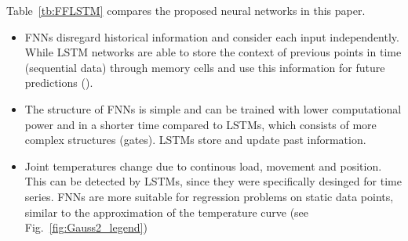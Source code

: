 \documentclass{ifacconf}
\begin{document}
Table~\ref{tb:FFLSTM} compares the proposed neural networks in this paper.
\begin{table}[ht]
  \begin{center}
  \caption{Comparison of Feedforward and LSTM neural networks}\label{tb:FFLSTM}
  \end{center}
\end{table}
\begin{itemize}
	\item FNNs disregard historical information and consider each input independently. While LSTM networks are able to store the context of previous points in time (sequential data) through memory cells and use this information for future predictions (\cite{Liu}).
  \item The structure of FNNs is simple and can be trained with lower computational power and in a shorter time compared to LSTMs, which consists of more complex structures (gates). LSTMs store and update past information.
  \item Joint temperatures change due to continous load, movement and position. This can be detected by LSTMs, since they were specifically desinged for time series. FNNs are more suitable for regression problems on static data points, similar to the approximation of the temperature curve (see Fig.~\ref{fig:Gauss2_legend})
\end{itemize}
\end{document}
